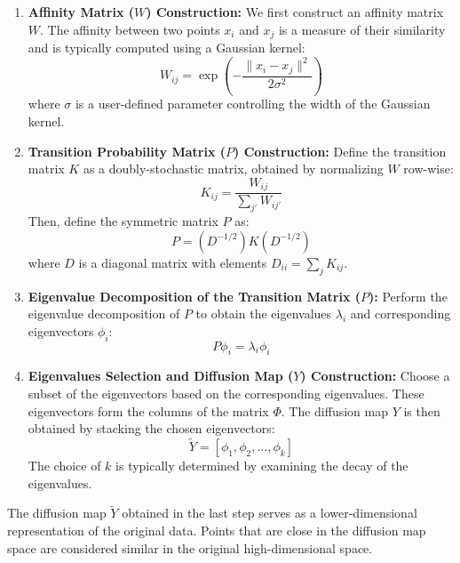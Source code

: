 \begin{enumerate}
    \item \textbf{Affinity Matrix (\(W\)) Construction:}
    We first construct an affinity matrix \(W\). The affinity between two points \(x_i\) and \(x_j\) is a measure of their similarity and is typically computed using a Gaussian kernel:
    \[ W_{ij} = \exp\left(-\frac{\|x_i - x_j\|^2}{2\sigma^2}\right) \]
    where \(\sigma\) is a user-defined parameter controlling the width of the Gaussian kernel.

    \item \textbf{Transition Probability Matrix (\(P\)) Construction:}
    Define the transition matrix \(K\) as a doubly-stochastic matrix, obtained by normalizing \(W\) row-wise:
    \[ K_{ij} = \frac{W_{ij}}{\sum_{j'} W_{ij'}} \]
    Then, define the symmetric matrix \(P\) as:
    \[ P = (D^{-1/2})K(D^{-1/2}) \]
    where \(D\) is a diagonal matrix with elements \(D_{ii} = \sum_{j} K_{ij}\).

    \item \textbf{Eigenvalue Decomposition of the Transition Matrix (\(P\)):}
    Perform the eigenvalue decomposition of \(P\) to obtain the eigenvalues \(\lambda_i\) and corresponding eigenvectors \(\phi_i\):
    \[ P\phi_i = \lambda_i \phi_i \]

    \item \textbf{Eigenvalues Selection and Diffusion Map (\(Y\)) Construction:}
    Choose a subset of the eigenvectors based on the corresponding eigenvalues. These eigenvectors form the columns of the matrix \(\Phi\). The diffusion map \(Y\) is then obtained by stacking the chosen eigenvectors:
    \[ \tilde{Y} = [\phi_1, \phi_2, \ldots, \phi_k] \]
    The choice of \(k\) is typically determined by examining the decay of the eigenvalues.
\end{enumerate}

The diffusion map \(\tilde{Y}\) obtained in the last step serves as a lower-dimensional representation of the original data. Points that are close in the diffusion map space are considered similar in the original high-dimensional space. \\


